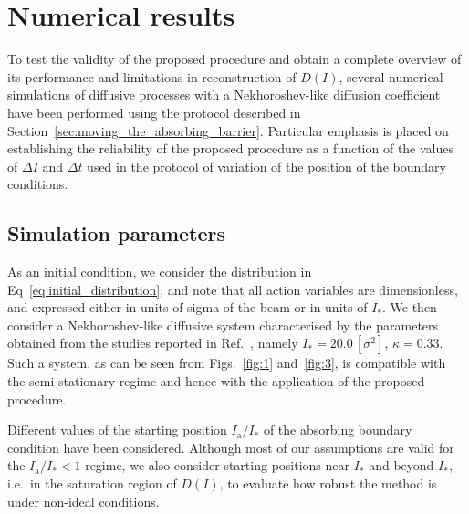 {%

\section{Numerical results}
\label{sec:numerical_results}


To test the validity of the proposed procedure and obtain a complete overview of its performance and limitations in reconstruction of $D(I)$, several numerical simulations of diffusive processes with a Nekhoroshev-like diffusion coefficient have been performed using the protocol described in Section~\ref{sec:moving_the_absorbing_barrier}. Particular emphasis is placed on establishing the reliability of the proposed procedure as a function of the values of $\Delta I$ and $\Delta t$ used in the protocol of variation of the position of the boundary conditions.


\subsection{Simulation parameters}


As an initial condition, we consider the distribution in Eq~\eqref{eq:initial_distribution}, and note that all action variables are {dimensionless, and expressed either in units of sigma of the beam or in units of $I_\ast$}. We then consider a Nekhoroshev-like diffusive system characterised by the parameters obtained from the studies reported in Ref.~\cite{bazzani2020diffusion}, namely $I_\ast = 20.0\,[\sigma^2]$, $\kappa = 0.33$. Such a system, as can be seen from Figs.~\ref{fig:1} and~\ref{fig:3}, is compatible with the semi-stationary regime and hence with the application of the proposed procedure.

Different values of the starting position $I_\mathrm{a}/I_\ast$ of the absorbing boundary condition have been considered. Although most of our assumptions are valid for the $I_\mathrm{a}/I_\ast < 1$ regime, we also consider starting positions near $I_\ast$ and beyond $I_\ast$, i.e.\ in the saturation region of $D(I)$, to evaluate how robust the method is under non-ideal conditions.

}
